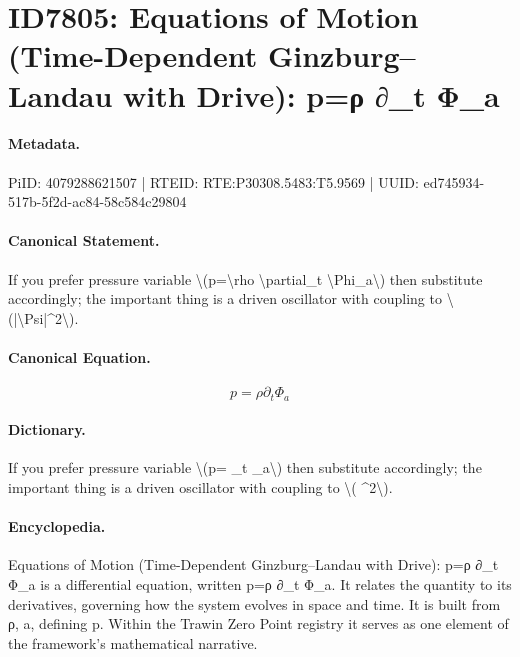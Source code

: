 \section*{ID7805: Equations of Motion (Time-Dependent Ginzburg–Landau with Drive): p=ρ ∂\_t Φ\_a}
\paragraph{Metadata.}
PiID: 4079288621507 | RTEID: RTE:P30308.5483:T5.9569 | UUID: ed745934-517b-5f2d-ac84-58c584c29804

\paragraph{Canonical Statement.}
If you prefer pressure variable \textbackslash{}(p=\textbackslash{}rho \textbackslash{}partial\_t \textbackslash{}Phi\_a\textbackslash{}) then substitute accordingly; the important thing is a driven oscillator with coupling to \textbackslash{}(|\textbackslash{}Psi|\textasciicircum{}2\textbackslash{}).

\paragraph{Canonical Equation.}
\[
p=\rho \partial_t \Phi_a
\]

\paragraph{Dictionary.}
If you prefer pressure variable \textbackslash{}(p= \_t \_a\textbackslash{}) then substitute accordingly; the important thing is a driven oscillator with coupling to \textbackslash{}( \textasciicircum{}2\textbackslash{}).

\paragraph{Encyclopedia.}
Equations of Motion (Time-Dependent Ginzburg–Landau with Drive): p=ρ ∂\_t Φ\_a is a differential equation, written p=ρ ∂\_t Φ\_a. It relates the quantity to its derivatives, governing how the system evolves in space and time. It is built from ρ, a, defining p. Within the Trawin Zero Point registry it serves as one element of the framework's mathematical narrative.
